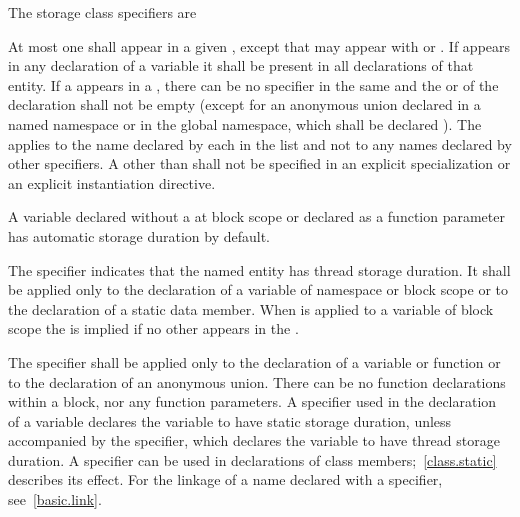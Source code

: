 \pnum
The storage class specifiers are

\begin{bnf}
\br
    \br
    \br
    \br
\end{bnf}

At most one  shall appear in a given
, except that  may appear with  or
. If  appears in any declaration of
a variable it shall be present in all declarations of that entity. If a
appears in a , there can be no
 specifier in the same  and
the  or 
of the declaration shall not be
empty (except for an anonymous union declared in a named namespace or in the
global namespace, which shall be declared
%
). The
 applies to the name declared by each
 in the list and not to any names declared by
other specifiers. A 
other than 
shall not be
specified in an explicit specialization or an
explicit instantiation directive.

\pnum
\begin{note}
A variable declared without a 
at block scope or declared as a function parameter
has automatic storage duration by default.
\end{note}

\pnum
The  specifier
indicates that the named entity has thread storage duration. It
shall be applied only
to the declaration of a variable of namespace
or block scope or to the declaration of a static data member.
When  is applied to a variable of block scope the
  is implied if no other
 appears in the
.

\pnum
{}%
The  specifier shall be applied only to the declaration of a variable or
function or to the declaration of an anonymous union. There can be no
 function declarations within a block, nor any
 function parameters. A  specifier used in
the declaration of a variable declares the variable to have static storage
duration, unless accompanied by the
 specifier, which declares the variable to have thread
storage duration. A  specifier can be
used in declarations of class members;~\ref{class.static} describes its
effect.
%
For the linkage of a name declared with a  specifier,
see~\ref{basic.link}.

